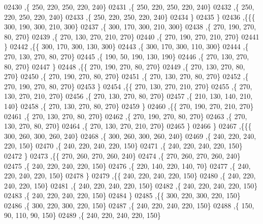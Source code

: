 \begin{DoxyCode}
02430     ,\{   250,   220,   250,   220,   240\}
02431     ,\{   250,   220,   250,   220,   240\}
02432     ,\{   250,   220,   250,   220,   240\}
02433     ,\{   250,   220,   250,   220,   240\}
02434     \}
02435    \}
02436   ,\{\{\{   300,   190,   300,   210,   300\}
02437     ,\{   300,   170,   300,   210,   300\}
02438     ,\{   270,   190,   270,    80,   270\}
02439     ,\{   270,   130,   270,   210,   270\}
02440     ,\{   270,   190,   270,   210,   270\}
02441     \}
02442    ,\{\{   300,   170,   300,   130,   300\}
02443     ,\{   300,   170,   300,   110,   300\}
02444     ,\{   270,   130,   270,    80,   270\}
02445     ,\{   190,    50,   190,   130,   190\}
02446     ,\{   270,   130,   270,    80,   270\}
02447     \}
02448    ,\{\{   270,   190,   270,    80,   270\}
02449     ,\{   270,   130,   270,    80,   270\}
02450     ,\{   270,   190,   270,    80,   270\}
02451     ,\{   270,   130,   270,    80,   270\}
02452     ,\{   270,   190,   270,    80,   270\}
02453     \}
02454    ,\{\{   270,   130,   270,   210,   270\}
02455     ,\{   270,   130,   270,   210,   270\}
02456     ,\{   270,   130,   270,    80,   270\}
02457     ,\{   210,   130,   140,   210,   140\}
02458     ,\{   270,   130,   270,    80,   270\}
02459     \}
02460    ,\{\{   270,   190,   270,   210,   270\}
02461     ,\{   270,   130,   270,    80,   270\}
02462     ,\{   270,   190,   270,    80,   270\}
02463     ,\{   270,   130,   270,    80,   270\}
02464     ,\{   270,   130,   270,   210,   270\}
02465     \}
02466    \}
02467   ,\{\{\{   300,   260,   300,   260,   240\}
02468     ,\{   300,   260,   300,   260,   240\}
02469     ,\{   240,   220,   240,   220,   150\}
02470     ,\{   240,   220,   240,   220,   150\}
02471     ,\{   240,   220,   240,   220,   150\}
02472     \}
02473    ,\{\{   270,   260,   270,   260,   240\}
02474     ,\{   270,   260,   270,   260,   240\}
02475     ,\{   240,   220,   240,   220,   150\}
02476     ,\{   220,   140,   220,   140,    70\}
02477     ,\{   240,   220,   240,   220,   150\}
02478     \}
02479    ,\{\{   240,   220,   240,   220,   150\}
02480     ,\{   240,   220,   240,   220,   150\}
02481     ,\{   240,   220,   240,   220,   150\}
02482     ,\{   240,   220,   240,   220,   150\}
02483     ,\{   240,   220,   240,   220,   150\}
02484     \}
02485    ,\{\{   300,   220,   300,   220,   150\}
02486     ,\{   300,   220,   300,   220,   150\}
02487     ,\{   240,   220,   240,   220,   150\}
02488     ,\{   150,    90,   110,    90,   150\}
02489     ,\{   240,   220,   240,   220,   150\}

\end{DoxyCode}
